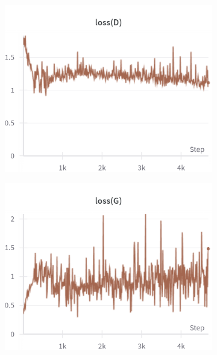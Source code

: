 \begin{figure}[H]
    \centering

    \begin{subfigure}{0.45\textwidth}
        \centering
        \includegraphics[width=0.95\linewidth]{ndf/8/lossD.png}
        \caption{}
        \label{subfig:ndf/8/lossD}
    \end{subfigure}%
    \begin{subfigure}{0.45\textwidth}
        \centering
        \includegraphics[width=0.95\linewidth]{ndf/8/lossG.png}
        \caption{}
        \label{subfig:ndf/8/lossG}
    \end{subfigure}


\end{figure}
